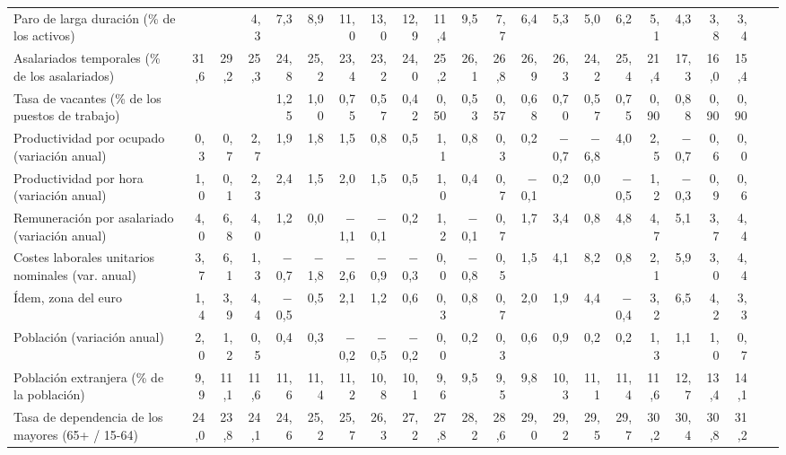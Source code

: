 \begin{tabular}{@{}>{\raggedright\arraybackslash}p{\dimexpr\anchoetq-\tabcolsep\relax}*{21}{N}@{}}
\hspace*{0.8em}Paro de larga duración (\% de los activos) &  &  & 4{,}3 & 7{,}3 & 8{,}9 & 11{,}0 & 13{,}0 & 12{,}9 & 11{,}4 & 9{,}5 & 7{,}7 & 6{,}4 & 5{,}3 & 5{,}0 & 6{,}2 & 5{,}1 & 4{,}3 & 3{,}8 & 3{,}4 &  &  \\
Asalariados temporales (\% de los asalariados) & 31{,}6 & 29{,}2 & 25{,}3 & 24{,}8 & 25{,}2 & 23{,}4 & 23{,}2 & 24{,}0 & 25{,}2 & 26{,}1 & 26{,}8 & 26{,}9 & 26{,}3 & 24{,}2 & 25{,}4 & 21{,}4 & 17{,}3 & 16{,}0 & 15{,}4 &  &  \\
Tasa de vacantes (\% de los puestos de trabajo) &  &  &  & 1{,}25 & 1{,}00 & 0{,}75 & 0{,}57 & 0{,}42 & 0{,}50 & 0{,}53 & 0{,}57 & 0{,}68 & 0{,}70 & 0{,}57 & 0{,}75 & 0{,}90 & 0{,}88 & 0{,}90 & 0{,}90 &  &  \\
Productividad por ocupado (variación anual) & 0{,}3 & 0{,}7 & 2{,}7 & 1{,}9 & 1{,}8 & 1{,}5 & 0{,}8 & 0{,}5 & 1{,}1 & 0{,}8 & 0{,}3 & 0{,}2 & $-$0{,}7 & $-$6{,}8 & 4{,}0 & 2{,}5 & $-$0{,}7 & 0{,}6 & 0{,}0 &  &  \\
Productividad por hora (variación anual) & 1{,}0 & 0{,}1 & 2{,}3 & 2{,}4 & 1{,}5 & 2{,}0 & 1{,}5 & 0{,}5 & 1{,}0 & 0{,}4 & 0{,}7 & $-$0{,}1 & 0{,}2 & 0{,}0 & $-$0{,}5 & 1{,}2 & $-$0{,}3 & 0{,}9 & 0{,}6 &  &  \\
Remuneración por asalariado (variación anual) & 4{,}0 & 6{,}8 & 4{,}0 & 1{,}2 & 0{,}0 & $-$1{,}1 & $-$0{,}1 & 0{,}2 & 1{,}2 & $-$0{,}1 & 0{,}7 & 1{,}7 & 3{,}4 & 0{,}8 & 4{,}8 & 4{,}7 & 5{,}1 & 3{,}7 & 4{,}4 &  &  \\
Costes laborales unitarios nominales (var. anual) & 3{,}7 & 6{,}1 & 1{,}3 & $-$0{,}7 & $-$1{,}8 & $-$2{,}6 & $-$0{,}9 & $-$0{,}3 & 0{,}0 & $-$0{,}8 & 0{,}5 & 1{,}5 & 4{,}1 & 8{,}2 & 0{,}8 & 2{,}1 & 5{,}9 & 3{,}0 & 4{,}4 &  &  \\
\hspace*{0.8em}Ídem, zona del euro & 1{,}4 & 3{,}9 & 4{,}4 & $-$0{,}5 & 0{,}5 & 2{,}1 & 1{,}2 & 0{,}6 & 0{,}3 & 0{,}8 & 0{,}7 & 2{,}0 & 1{,}9 & 4{,}4 & $-$0{,}4 & 3{,}2 & 6{,}5 & 4{,}2 & 3{,}3 &  &  \\
Población (variación anual) & 2{,}0 & 1{,}2 & 0{,}5 & 0{,}4 & 0{,}3 & $-$0{,}2 & $-$0{,}5 & $-$0{,}2 & 0{,}0 & 0{,}2 & 0{,}3 & 0{,}6 & 0{,}9 & 0{,}2 & 0{,}2 & 1{,}3 & 1{,}1 & 1{,}0 & 0{,}7 &  &  \\
Población extranjera (\% de la población) & 9{,}9 & 11{,}1 & 11{,}6 & 11{,}6 & 11{,}4 & 11{,}2 & 10{,}8 & 10{,}1 & 9{,}6 & 9{,}5 & 9{,}5 & 9{,}8 & 10{,}3 & 11{,}1 & 11{,}4 & 11{,}6 & 12{,}7 & 13{,}4 & 14{,}1 &  &  \\
Tasa de dependencia de los mayores (65+ / 15-64) & 24{,}0 & 23{,}8 & 24{,}1 & 24{,}6 & 25{,}2 & 25{,}7 & 26{,}3 & 27{,}2 & 27{,}8 & 28{,}2 & 28{,}6 & 29{,}0 & 29{,}2 & 29{,}5 & 29{,}7 & 30{,}2 & 30{,}4 & 30{,}8 & 31{,}2 &  &  \\
\bottomrule
\end{tabular}
